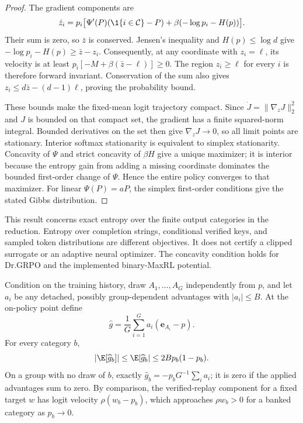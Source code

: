 \begin{proof}
The gradient components are
\[
 \dot z_i=p_i\bigl[\Psi'(P)(\1\{i\in\mathcal C\}-P)
       +\beta(-\log p_i-H(p))\bigr].
\]
Their sum is zero, so $\bar z$ is conserved. Jensen's inequality and
$H(p)\le\log d$ give
$-\log p_i-H(p)\ge\bar z-z_i$.
Consequently, at any coordinate with $z_i=\ell$, its velocity is at least
$p_i[-M+\beta(\bar z-\ell)]\ge0$. The region $z_i\ge\ell$ for every $i$
is therefore forward invariant. Conservation of the sum also gives
$z_i\le d\bar z-(d-1)\ell$, proving the probability bound.

These bounds make the fixed-mean logit trajectory compact.
Since $\dot J=\|\nabla_zJ\|_2^2$ and $J$ is bounded on that compact set,
the gradient has a finite squared-norm integral. Bounded derivatives on the
set then give $\nabla_zJ\to0$, so all limit points are stationary.
Interior softmax stationarity is equivalent to simplex stationarity.
Concavity of $\Psi$ and strict concavity of $\beta H$ give a unique maximizer;
it is interior because the entropy gain from adding a missing coordinate
dominates the bounded first-order change of $\Psi$. Hence the entire policy
converges to that maximizer. For linear $\Psi(P)=aP$, the simplex
first-order conditions give the stated Gibbs distribution.
\end{proof}

This result concerns exact entropy over the finite output categories in the
reduction. Entropy over completion strings, conditional verified keys, and
sampled token distributions are different objectives. It does not certify a
clipped surrogate or an adaptive neural optimizer. The concavity condition
holds for Dr.GRPO and the implemented binary-MaxRL potential.

\begin{lemma}
\label{lem:sampled-score-bound}
Condition on the training history, draw $A_1,\ldots,A_G$ independently from
$p$, and let $a_i$ be any detached, possibly group-dependent advantages with
$|a_i|\le B$. At the on-policy point define
\[
 \widehat g=\frac1G\sum_{i=1}^G a_i(\mathbf e_{A_i}-p).
\]
For every category $b$,
\[
 |\E[\widehat g_b]|\le\E|\widehat g_b|
 \le 2B p_b(1-p_b).
\]
On a group with no draw of $b$, exactly
$\widehat g_b=-p_bG^{-1}\sum_i a_i$; it is zero if the applied advantages
sum to zero. By comparison, the verified-replay component for a fixed target
$w$ has logit velocity $\rho(w_b-p_b)$, which approaches $\rho w_b>0$
for a banked category as $p_b\to0$.
\end{lemma}

